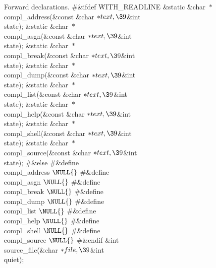 Forward declarations.
\Y\B\8\#\&{ifdef} \.{WITH\_READLINE}\6
\&{static} \&{char} ${}{*}{}$\\{compl\_address}(\&{const} \&{char} ${}{*}%
\\{text},\39{}$\&{int} \\{state});\6
\&{static} \&{char} ${}{*}{}$\\{compl\_asgn}(\&{const} \&{char} ${}{*}\\{text},%
\39{}$\&{int} \\{state});\6
\&{static} \&{char} ${}{*}{}$\\{compl\_break}(\&{const} \&{char} ${}{*}%
\\{text},\39{}$\&{int} \\{state});\6
\&{static} \&{char} ${}{*}{}$\\{compl\_dump}(\&{const} \&{char} ${}{*}\\{text},%
\39{}$\&{int} \\{state});\6
\&{static} \&{char} ${}{*}{}$\\{compl\_list}(\&{const} \&{char} ${}{*}\\{text},%
\39{}$\&{int} \\{state});\6
\&{static} \&{char} ${}{*}{}$\\{compl\_help}(\&{const} \&{char} ${}{*}\\{text},%
\39{}$\&{int} \\{state});\6
\&{static} \&{char} ${}{*}{}$\\{compl\_shell}(\&{const} \&{char} ${}{*}%
\\{text},\39{}$\&{int} \\{state});\6
\&{static} \&{char} ${}{*}{}$\\{compl\_source}(\&{const} \&{char} ${}{*}%
\\{text},\39{}$\&{int} \\{state});\6
\8\#\&{else}\6
\8\#\&{define} \\{compl\_address} \5${}\NULL{}$\6
\8\#\&{define} \\{compl\_asgn} \5${}\NULL{}$\6
\8\#\&{define} \\{compl\_break} \5${}\NULL{}$\6
\8\#\&{define} \\{compl\_dump} \5${}\NULL{}$\6
\8\#\&{define} \\{compl\_list} \5${}\NULL{}$\6
\8\#\&{define} \\{compl\_help} \5${}\NULL{}$\6
\8\#\&{define} \\{compl\_shell} \5${}\NULL{}$\6
\8\#\&{define} \\{compl\_source} \5${}\NULL{}$\6
\8\#\&{endif}\6
\&{int} \\{source\_file}(\&{char} ${}{*}\\{file},\39{}$\&{int} \\{quiet});\par
\fi


